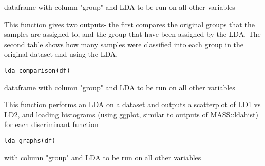 \documentclass[a4paper]{book}
\begin{document}
%
\begin{Arguments}
\begin{ldescription}
\item[\code{df}] dataframe with column "group" and LDA to be run on all other variables
\end{ldescription}
\end{Arguments}
%
\begin{Description}\relax
This function gives two outputs- the first compares the original groups that the samples are assigned to, and the group that have been assigned by the LDA. The second table shows how many samples were classified into each group in the original dataset and using the LDA.
\end{Description}
%
\begin{Usage}
\begin{verbatim}
lda_comparison(df)
\end{verbatim}
\end{Usage}
%
\begin{Arguments}
\begin{ldescription}
\item[\code{df}] dataframe with column "group" and LDA to be run on all other variables
\end{ldescription}
\end{Arguments}
%
\begin{Description}\relax
This function performs an LDA on a dataset and outputs a scatterplot of LD1 vs LD2, and loading histograms (using ggplot, similar to outputs of MASS::ldahist) for each discriminant function
\end{Description}
%
\begin{Usage}
\begin{verbatim}
lda_graphs(df)
\end{verbatim}
\end{Usage}
%
\begin{Arguments}
\begin{ldescription}
\item[\code{dataframe}] with column "group" and LDA to be run on all other variables
\end{ldescription}
\end{Arguments}
\end{document}
